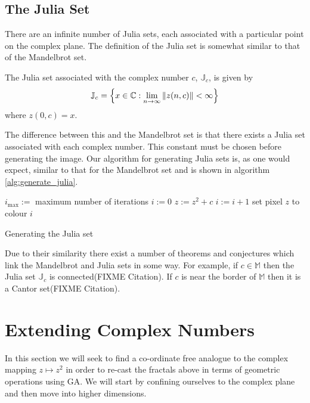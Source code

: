 \subsection{The Julia Set}

There are an infinite number of Julia sets, each associated with
a particular point on the complex plane. The definition of the Julia set is somewhat
similar to that of the Mandelbrot set.

\begin{definition}
The Julia set associated
with the complex number $c$, $\mathbb{J}_c$, is given by
\[
\mathbb{J}_c = 
\left\{x \in \mathbb{C}
: \lim_{n \rightarrow \infty} \left\Vert z(n,c) \right\Vert < \infty \right\} 
\]
where $z(0,c) = x$.
\end{definition}

The difference between this and the Mandelbrot set is that there exists a 
Julia set associated with each complex number. This constant must be chosen before
generating the image. Our algorithm for generating Julia sets is, as one would
expect, similar to that for the Mandelbrot set and is shown in algorithm
\ref{alg:generate_julia}.

\begin{fancyalg}
\begin{algorithmic}[1]
\STATE $i_{\mbox{max}} :=$ maximum number of iterations
\STATE $i := 0$
  \STATE $z := z^2 + c$
  \STATE $i := i+1$
\ENDWHILE 
\STATE set pixel $z$ to colour $i$
\ENDFOR
\end{algorithmic}
\caption{
\label{alg:generate_julia}
  Generating the Julia set}
\end{fancyalg}

Due to their similarity there exist a number of theorems and conjectures which link the
Mandelbrot and Julia sets in some way. For example, if $c \in \mathbb{M}$ then
the Julia set $\mathbb{J}_c$ is connected(FIXME Citation). If $c$ is near the 
border of $\mathbb{M}$ then it is a Cantor set(FIXME Citation).

\section{Extending Complex Numbers}

In this section we will seek to find a co-ordinate free analogue to the
complex mapping $z \mapsto z^2$ in order to re-cast the fractals above in
terms of geometric operations using GA. We will start by confining ourselves
to the complex plane and then move into higher dimensions.

